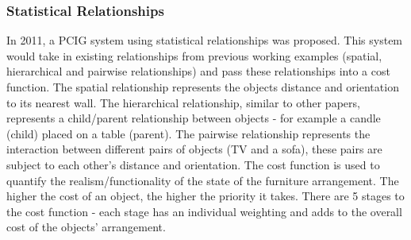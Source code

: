 \subsubsection*{Statistical Relationships}
In 2011, a PCIG system using statistical relationships was proposed\cite{make-it-home}\cite{youtube:make-it-home}. This system would take in existing relationships from previous working examples (spatial, hierarchical and pairwise relationships) and pass these relationships into a cost function. The spatial relationship represents the objects distance and orientation to its nearest wall. The hierarchical relationship, similar to other papers, represents a child/parent relationship between objects - for example a candle (child) placed on a table (parent). The pairwise relationship represents the interaction between different pairs of objects (TV and a sofa), these pairs are subject to each other's distance and orientation.
The cost function is used to quantify the realism/functionality of the state of the furniture arrangement. The higher the cost of an object, the higher the priority it takes. 
There are 5 stages to the cost function - each stage has an individual weighting and adds to the overall cost of the objects' arrangement.
